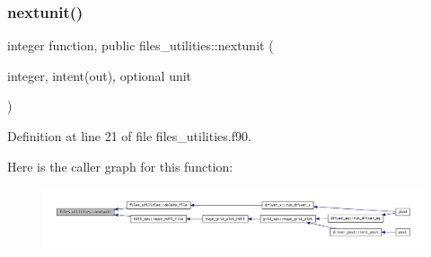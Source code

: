 \subsubsection{\texorpdfstring{nextunit()}{nextunit()}}
{\footnotesize\ttfamily integer function, public files\+\_\+utilities\+::nextunit (\begin{DoxyParamCaption}\item[{integer, intent(out), optional}]{unit }\end{DoxyParamCaption})}



Definition at line 21 of file files\+\_\+utilities.\+f90.

Here is the caller graph for this function\+:
\nopagebreak
\begin{figure}[H]
\begin{center}
\leavevmode
\includegraphics[width=350pt]{namespacefiles__utilities_ac6066df405564ba2f5e3c4bba726c1f8_icgraph}
\end{center}
\end{figure}
